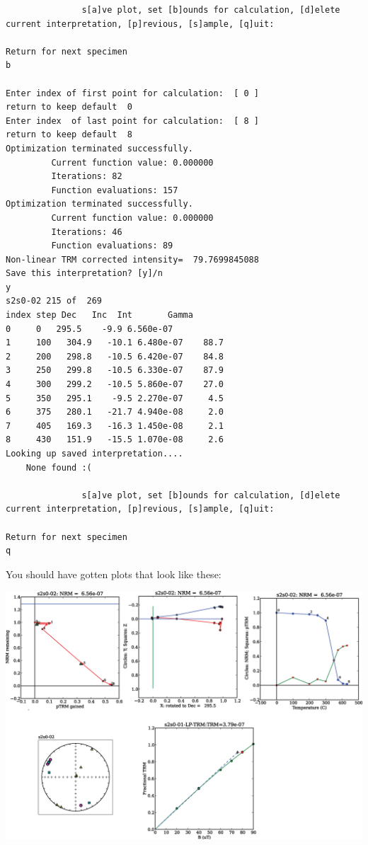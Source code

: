 \documentclass[11pt]{book}
\begin{document}
{\begin{verbatim}
               s[a]ve plot, set [b]ounds for calculation, [d]elete current interpretation, [p]revious, [s]ample, [q]uit:

Return for next specimen
b

Enter index of first point for calculation:  [ 0 ]
return to keep default  0
Enter index  of last point for calculation:  [ 8 ]
return to keep default  8
Optimization terminated successfully.
         Current function value: 0.000000
         Iterations: 82
         Function evaluations: 157
Optimization terminated successfully.
         Current function value: 0.000000
         Iterations: 46
         Function evaluations: 89
Non-linear TRM corrected intensity=  79.7699845088
Save this interpretation? [y]/n
y
s2s0-02 215 of  269
index step Dec   Inc  Int       Gamma
0     0   295.5    -9.9 6.560e-07
1     100   304.9   -10.1 6.480e-07    88.7
2     200   298.8   -10.5 6.420e-07    84.8
3     250   299.8   -10.5 6.330e-07    87.9
4     300   299.2   -10.5 5.860e-07    27.0
5     350   295.1    -9.5 2.270e-07     4.5
6     375   280.1   -21.7 4.940e-08     2.0
7     405   169.3   -16.3 1.450e-08     2.1
8     430   151.9   -15.5 1.070e-08     2.6
Looking up saved interpretation....
    None found :(

               s[a]ve plot, set [b]ounds for calculation, [d]elete current interpretation, [p]revious, [s]ample, [q]uit:

Return for next specimen
q
\end{verbatim}

You should have gotten plots that look like these:

\includegraphics[width=15cm]{EPSfiles/thellier_magic.eps}



}
\end{document}
